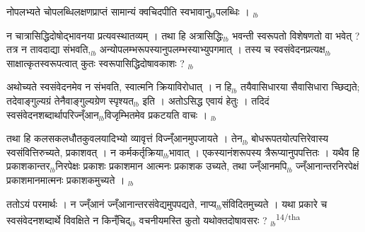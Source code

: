 \documentclass[article,12pt,a4paper]{memoir}%
\newcounter{parCount}
\begin{document}
	  \pstart \leavevmode%
	नोपलभ्यते चोपलब्धिलक्षणप्राप्तं सामान्यं क्वचिदपीति स्वभावानु{\tiny $_{lb}$}पलब्धिः ।
	{}
	\pend%
      {\tiny $_{lb}$}

	  \pstart \leavevmode%
	न चात्रासिद्धिदोषोद्भावनया प्रत्यवस्थातव्यम् । तथा हि अत्रासिद्धिः{\tiny $_{lb}$} भवन्ती स्वरूपतो विशेषणतो वा भवेत् ? तत्र न तावदाद्या संभवति,{\tiny $_{lb}$} अन्योपलम्भरूपस्यानुपलम्भस्याभ्युपगमात् । तस्य च स्वसंवेदनप्रत्यक्ष{\tiny $_{lb}$}साक्षात्कृतस्वरूपत्वात् कुतः स्वरूपासिद्धिदोषावकाशः ?
	{}
	\pend%
      {\tiny $_{lb}$}

	  \pstart \leavevmode%
	अथोच्यते स्वसंवेदनमेव न संभवति, स्वात्मनि क्रियाविरोधात् । न हि{\tiny $_{lb}$} तयैवासिधारया सैवासिधारा च्छिद्यते; तदेवाङ्गुल्यग्रं तेनैवाङ्गुल्यग्रेण स्पृश्यत{\tiny $_{lb}$} इति । अतोऽसिद्ध एवायं हेतुः । तदिदं स्वसंवेदनशब्दार्थापरिज्न्ँआन{\tiny $_{lb}$}विजृम्भितमेव प्रकटयति वाचः ।
	{}
	\pend%
      {\tiny $_{lb}$}

	  \pstart \leavevmode%
	तथा हि कलसकलधौतकुवलयादिभ्यो व्यावृत्तं विज्न्ँआनमुपजायते । तेन{\tiny $_{lb}$} बोधरूपतयोत्पत्तिरेवास्य स्वसंवित्तिरुच्यते, प्रकाशवत् । न कर्मकर्तृक्रिया{\tiny $_{lb}$}भावात् । एकस्यानंशरूपस्य त्रैरूप्यानुपपत्तितः । यथैव हि प्रकाशकान्तर{\tiny $_{lb}$}निरपेक्षः प्रकाशः प्रकाशमान आत्मनः प्रकाशक उच्यते, तथा ज्न्ँआनमपि{\tiny $_{lb}$} ज्न्ँआनान्तरनिरपेक्षं प्रकाशमानमात्मनः प्रकाशकमुच्यते ।
	{}
	\pend%
      {\tiny $_{lb}$}

	  \pstart \leavevmode%
	ततोऽयं पर\leavevmode{}मार्थः । न ज्न्ँआनं ज्न्ँआनान्तरसंवेद्यमुपपद्यते, नाप्य{\tiny $_{lb}$}संविदितमुच्यते । यथा प्रकारे च स्वसंवेदनशब्दार्थे विवक्षिते न किन्ँचिद्{\tiny $_{lb}$} वचनीयमस्ति कुतो यथोक्तदोषावसरः ?
	{}
	\pend%
      {\tiny $_{lb}$}\textsuperscript{\textenglish{14/tha}}
\end{document}

